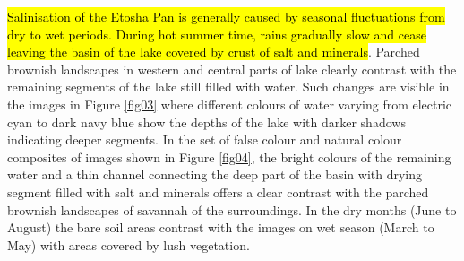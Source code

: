 \documentclass[climate,article,submit,pdftex,moreauthors]{Definitions/mdpi}
\begin{document}
\hl{Salinisation of the Etosha Pan is generally caused by seasonal fluctuations from dry to wet periods. During hot summer time, rains gradually slow and cease leaving the basin of the lake covered by crust of salt and minerals}. Parched brownish landscapes in western and central parts of lake clearly contrast with the remaining segments of the lake still filled with water. Such changes are visible in the images in Figure \ref{fig03} where different colours of water varying from electric cyan to dark navy blue show the depths of the lake with darker shadows indicating deeper segments. In the set of false colour and natural colour composites of images shown in Figure \ref{fig04}, the bright colours of the remaining water and a thin channel connecting the deep part of the basin with drying segment filled with salt and minerals offers a clear contrast with the parched brownish landscapes of savannah of the surroundings. In the dry months (June to August) the bare soil areas contrast with the images on wet season (March to May) with areas covered by lush vegetation. 
\end{document}
